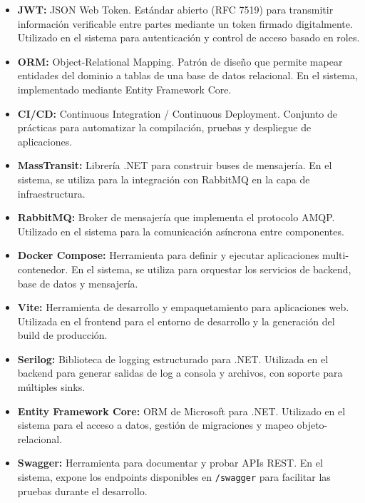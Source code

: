\documentclass[12pt,letterpaper]{article}
\begin{document}
\begin{itemize}
    \item \textbf{JWT:} JSON Web Token. Estándar abierto (RFC 7519) para transmitir información verificable entre partes mediante un token firmado digitalmente. Utilizado en el sistema para autenticación y control de acceso basado en roles.
    
    \item \textbf{ORM:} Object-Relational Mapping. Patrón de diseño que permite mapear entidades del dominio a tablas de una base de datos relacional. En el sistema, implementado mediante Entity Framework Core.
    
    \item \textbf{CI/CD:} Continuous Integration / Continuous Deployment. Conjunto de prácticas para automatizar la compilación, pruebas y despliegue de aplicaciones.
    
    \item \textbf{MassTransit:} Librería .NET para construir buses de mensajería. En el sistema, se utiliza para la integración con RabbitMQ en la capa de infraestructura.
    
    \item \textbf{RabbitMQ:} Broker de mensajería que implementa el protocolo AMQP. Utilizado en el sistema para la comunicación asíncrona entre componentes.
    
    \item \textbf{Docker Compose:} Herramienta para definir y ejecutar aplicaciones multi-contenedor. En el sistema, se utiliza para orquestar los servicios de backend, base de datos y mensajería.
    
    \item \textbf{Vite:} Herramienta de desarrollo y empaquetamiento para aplicaciones web. Utilizada en el frontend para el entorno de desarrollo y la generación del build de producción.
    
    \item \textbf{Serilog:} Biblioteca de logging estructurado para .NET. Utilizada en el backend para generar salidas de log a consola y archivos, con soporte para múltiples sinks.
    
    \item \textbf{Entity Framework Core:} ORM de Microsoft para .NET. Utilizado en el sistema para el acceso a datos, gestión de migraciones y mapeo objeto-relacional.
    
    \item \textbf{Swagger:} Herramienta para documentar y probar APIs REST. En el sistema, expone los endpoints disponibles en \texttt{/swagger} para facilitar las pruebas durante el desarrollo.
    

\end{itemize}
\end{document}
